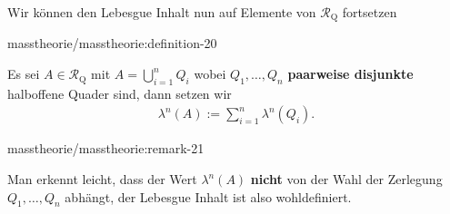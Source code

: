 \documentclass[letterpaper,10pt,german]{jupyterBook}
\begin{document}
\par
Wir können den Lebesgue Inhalt nun auf Elemente von \(\mathcal{R}_{\text{Q}}\) fortsetzen
\begin{definition}{}{masstheorie/masstheorie:definition-20}



\par
Es sei \(A\in\mathcal{R}_{\text{Q}}\) mit \(A=\bigcup_{i=1}^n Q_i\) wobei \(Q_1,\ldots,Q_n\) \textbf{paarweise disjunkte} halboffene Quader sind, dann setzen wir
\begin{align*}
\lambda^n(A):=\sum_{i=1}^{n} \lambda^n(Q_i).
\end{align*}\end{definition}
\begin{remark}{}{masstheorie/masstheorie:remark-21}



\par
Man erkennt leicht, dass der Wert \(\lambda^n(A)\) \textbf{nicht} von der Wahl der Zerlegung \(Q_1,\ldots,Q_n\) abhängt, der Lebesgue Inhalt ist also wohldefiniert.
\end{remark}
\end{document}
